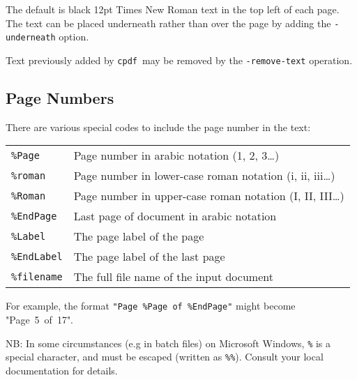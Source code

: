 \documentclass{book}
\newcommand{\cpdf}{\texttt{cpdf}}
\begin{document}
\noindent{}

  \noindent The default is black 12pt Times New Roman text in the top left of each page. The text can be placed underneath rather than over the page by adding the \texttt{-underneath} option.
  
  Text previously added by \cpdf\ may be removed by the \texttt{-remove-text} operation.

\noindent{}

  \subsection{Page Numbers}
  There are various special codes to include the page number in the text:

  \vspace{2mm}
  \begin{tabular}{ll}
    \texttt{\%Page} & Page number in arabic notation (1, 2, 3\ldots) \\
    \texttt{\%roman} & Page number in lower-case roman notation (i, ii, iii\ldots) \\
    \texttt{\%Roman} & Page number in upper-case roman notation (I, II, III\ldots) \\
    \texttt{\%EndPage} & Last page of document in arabic notation \\
    \texttt{\%Label} & The page label of the page \\
    \texttt{\%EndLabel} & The page label of the last page \\
    \texttt{\%filename} & The full file name of the input document \\
  \end{tabular}

  \vspace{2mm}
  \noindent For example, the format \texttt{"Page~\%Page~of~\%EndPage"} might become "Page~5~of~17".

  NB: In some circumstances (e.g in batch files) on Microsoft Windows, \verb!%! is a special character, and must be escaped (written as \verb$%%$). Consult your local documentation for details.
\end{document}
